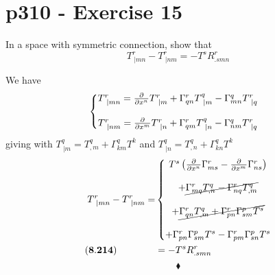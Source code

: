 \section{p310 - Exercise 15}
\begin{tcolorbox}
In a space with symmetric connection, show that 
$$T^r_{\ |mn} - T^r_{\ |nm } = - T^s R^r_{.smn}$$
\end{tcolorbox}
We have 
\begin{align*}
&\left\{\begin{matrix}
T^r_{\ |mn} = \pdv{}{x^n}T^r_{\ |m} + \Gamma^r_{qn}T^q_{\ |m} -\Gamma^q_{mn}T^r_{\ |q}\\\\
T^r_{\ |nm} = \pdv{}{x^m}T^r_{\ |n} + \Gamma^r_{qm}T^q_{\ |n} -\Gamma^q_{nm}T^r_{\ |q} 
\end{matrix}\right.
\end{align*}
giving with $ T^q_{\ |m}= T^q_{,m}+ \Gamma^q_{km}T^k$ and  $ T^q_{\ |n}= T^q_{,n}+ \Gamma^q_{kn}T^k$
\begin{align*}
T^r_{\ |mn}-T^r_{\ |nm}= &\left\{\begin{matrix}
T^s\left(\pdv{}{x^n}\Gamma^r_{ms}-\pdv{}{x^m}\Gamma^r_{ns}\right)\\\\
+ \cancel{\Gamma^r_{mq}T^q_{,n}-\Gamma^r_{nq}T^q_{,m}}
\\\\
  +\cancel{\Gamma^r_{qn}T^q_{,m}+\Gamma^r_{pn} \Gamma^p_{sm}T^s}\\\\
 +\Gamma^r_{pn}\Gamma^p_{sm}T^s- \Gamma^r_{pm}\Gamma^p_{sn}T^s
\end{matrix}\right.\\
\mathbf{(8.214)}\quad\quad\quad\quad &= -T^sR^r_{.smn}
\end{align*}
$$\blacklozenge$$
\newpage


